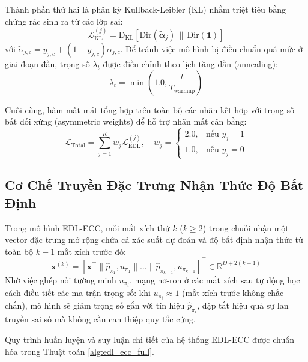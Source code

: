 \documentclass[1p,times]{elsarticle}
\begin{document}
Thành phần thứ hai là phân kỳ Kullback-Leibler (KL) nhằm triệt tiêu bằng chứng rác sinh ra từ các lớp sai:
\begin{equation}
    \mathcal{L}_{\text{KL}}^{(j)} = \text{D}_{\text{KL}}\left[\text{Dir}(\tilde{\boldsymbol{\alpha}}_j) \,\parallel\, \text{Dir}(\mathbf{1})\right]
\end{equation}
với $\tilde{\alpha}_{j,c} = y_{j,c} + (1 - y_{j,c})\alpha_{j,c}$. Để tránh việc mô hình bị điều chuẩn quá mức ở giai đoạn đầu, trọng số $\lambda_t$ được điều chỉnh theo lịch tăng dần (annealing):
\begin{equation}
    \lambda_t = \min\left(1.0, \frac{t}{T_{\text{warmup}}}\right)
\end{equation}

Cuối cùng, hàm mất mát tổng hợp trên toàn bộ các nhãn kết hợp với trọng số bất đối xứng (asymmetric weights) để hỗ trợ nhãn mất cân bằng:
\begin{equation}
    \mathcal{L}_{\text{Total}} = \sum_{j=1}^K w_j \mathcal{L}_{\text{EDL}}^{(j)}, \quad w_j = \begin{cases} 2.0, & \text{nếu } y_j = 1 \\ 1.0, & \text{nếu } y_j = 0 \end{cases}
\end{equation}

\subsection{Cơ Chế Truyền Đặc Trưng Nhận Thức Độ Bất Định}
Trong mô hình EDL-ECC, mỗi mắt xích thứ $k$ ($k \ge 2$) trong chuỗi nhận một vector đặc trưng mở rộng chứa cả xác suất dự đoán và độ bất định nhận thức từ toàn bộ $k-1$ mắt xích trước đó:
\begin{equation}
    \mathbf{x}^{(k)} = \left[ \mathbf{x}^\top \parallel \hat{p}_{\pi_1}, u_{\pi_1} \parallel \dots \parallel \hat{p}_{\pi_{k-1}}, u_{\pi_{k-1}} \right]^\top \in \mathbb{R}^{D + 2(k-1)}
    \label{eq:aug_propagation}
\end{equation}
Nhờ việc ghép nối tường minh $u_{\pi_i}$, mạng nơ-ron ở các mắt xích sau tự động học cách điều tiết các ma trận trọng số: khi $u_{\pi_i} \approx 1$ (mắt xích trước không chắc chắn), mô hình sẽ giảm trọng số gắn với tín hiệu $\hat{p}_{\pi_i}$, dập tắt hiệu quả sự lan truyền sai số mà không cần can thiệp quy tắc cứng.

Quy trình huấn luyện và suy luận chi tiết của hệ thống EDL-ECC được chuẩn hóa trong Thuật toán \ref{alg:edl_ecc_full}.
\end{document}
